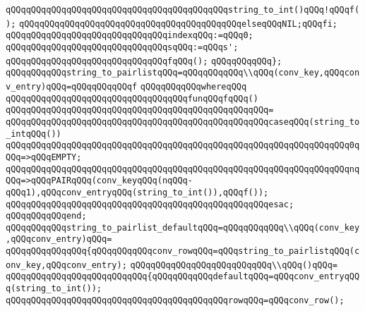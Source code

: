 \verb|qQQqqQQqqQQqqQQqqQQqqQQqqQQqqQQqqQQqqQQqqQQqstring_to_int()qQQq!qQQqf();|\newline
\verb|qQQqqQQqqQQqqQQqqQQqqQQqqQQqqQQqqQQqqQQqqQQqelseqQQqNIL;qQQqfi;|\newline
\verb|qQQqqQQqqQQqqQQqqQQqqQQqqQQqqQQqindexqQQq:=qQQq0;|\newline
\verb|qQQqqQQqqQQqqQQqqQQqqQQqqQQqqQQqsqQQq:=qQQqs';|\newline
\verb|qQQqqQQqqQQqqQQqqQQqqQQqqQQqqQQqfqQQq();|\newline
\verb|qQQqqQQqqQQq};|\newline
\newline
\verb|qQQqqQQqqQQqstring_to_pairlistqQQq=qQQqqQQqqQQq\\qQQq(conv_key,qQQqconv_entry)qQQq=qQQqqQQqqQQqf|\newline
\verb|qQQqqQQqqQQqwhereqQQq|\newline
\verb|qQQqqQQqqQQqqQQqqQQqqQQqqQQqqQQqqQQqfunqQQqfqQQq()|\newline
\verb|qQQqqQQqqQQqqQQqqQQqqQQqqQQqqQQqqQQqqQQqqQQqqQQqqQQq=|\newline
\verb|qQQqqQQqqQQqqQQqqQQqqQQqqQQqqQQqqQQqqQQqqQQqqQQqqQQqcaseqQQq(string_to_intqQQq())|\newline
\verb|qQQqqQQqqQQqqQQqqQQqqQQqqQQqqQQqqQQqqQQqqQQqqQQqqQQqqQQqqQQqqQQqqQQq0qQQq=>qQQqEMPTY;|\newline
\verb|qQQqqQQqqQQqqQQqqQQqqQQqqQQqqQQqqQQqqQQqqQQqqQQqqQQqqQQqqQQqqQQqqQQqnqQQq=>qQQqPAIRqQQq(conv_keyqQQq(nqQQq-qQQq1),qQQqconv_entryqQQq(string_to_int()),qQQqf());|\newline
\verb|qQQqqQQqqQQqqQQqqQQqqQQqqQQqqQQqqQQqqQQqqQQqqQQqqQQqesac;|\newline
\verb|qQQqqQQqqQQqend;|\newline
\newline
\verb|qQQqqQQqqQQqstring_to_pairlist_defaultqQQq=qQQqqQQqqQQq\\qQQq(conv_key,qQQqconv_entry)qQQq=|\newline
\verb|qQQqqQQqqQQqqQQq{qQQqqQQqqQQqconv_rowqQQq=qQQqstring_to_pairlistqQQq(conv_key,qQQqconv_entry);|\newline
\verb|qQQqqQQqqQQqqQQqqQQqqQQqqQQq\\qQQq()qQQq=|\newline
\verb|qQQqqQQqqQQqqQQqqQQqqQQqqQQq{qQQqqQQqqQQqdefaultqQQq=qQQqconv_entryqQQq(string_to_int());|\newline
\verb|qQQqqQQqqQQqqQQqqQQqqQQqqQQqqQQqqQQqqQQqqQQqrowqQQq=qQQqconv_row();|\newline
